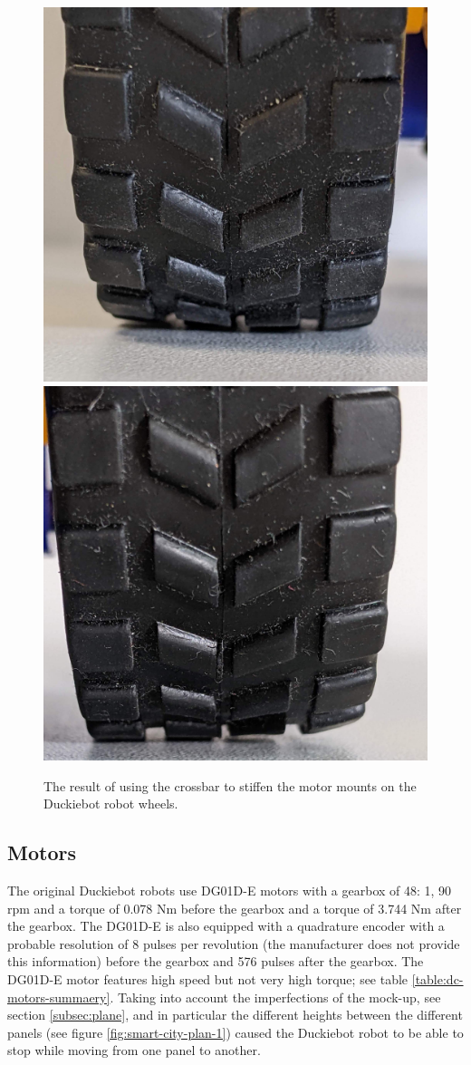 \documentclass[conference]{IEEEtran}
\begin{document}
\begin{figure}[ht!]
    \centering
    \includegraphics[width=.475\columnwidth]{wheel-contact-1.jpg}
    \includegraphics[width=.475\columnwidth]{wheel-contact-2.jpg}
    \caption{The result of using the crossbar to stiffen the motor mounts on the Duckiebot robot wheels.}
    \label{fig:wheel-contact}
\end{figure}

\subsection{Motors}
The original Duckiebot robots use DG01D-E motors with a gearbox of 48: 1, 90 rpm and a torque of 0.078 Nm before the gearbox and a torque of 3.744 Nm after the gearbox.
The DG01D-E is also equipped with a quadrature encoder with a probable resolution of 8 pulses per revolution (the manufacturer does not provide this information) before the gearbox and 576 pulses after the gearbox. The DG01D-E motor features high speed but not very high torque; see table \ref{table:dc-motors-summaery}. Taking into account the imperfections of the mock-up, see section \ref{subsec:plane}, and in particular the different heights between the different panels (see figure \ref{fig:smart-city-plan-1}) caused the Duckiebot robot to be able to stop while moving from one panel to another.
\end{document}
